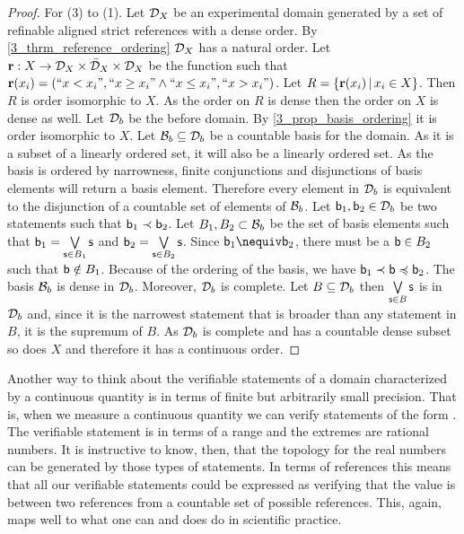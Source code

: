 \documentclass[11pt,letterpaper,fleqn]{memoir} %
\begin{document}
\begin{mathSection}
\begin{proof}
	For (3) to (1). Let $\edomain_X$ be an experimental domain generated by a set of refinable aligned strict references with a dense order. By \ref{3_thrm_reference_ordering} $\edomain_X$ has a natural order. Let $\refStmt : X \to \edomain_X \times \tdomain_X \times \edomain_X$ be the function such that $\refStmt(x_i) = (``x < x_i", ``x \geq x_i" \AND ``x \leq x_i", ``x > x_i")$. Let $R=\{ \refStmt(x_i) \, | \, x_i \in X \}$. Then $R$ is order isomorphic to $X$. As the order on $R$ is dense then the order on $X$ is dense as well. Let $\edomain_b$ be the before domain. By \ref{3_prop_basis_ordering} it is order isomorphic to $X$. Let $\basis_b \subseteq \edomain_b$ be a countable basis for the domain. As it is a subset of a linearly ordered set, it will also be a linearly ordered set. As the basis is ordered by narrowness, finite conjunctions and disjunctions of basis elements will return a basis element. Therefore every element in $\edomain_b$ is equivalent to the disjunction of a countable set of elements of $\basis_b$. Let $\stmt[b]_1, \stmt[b]_2 \in \edomain_b$ be two statements such that $\stmt[b]_1 \snarrower \stmt[b]_2$. Let $B_1, B_2 \subset \basis_b$ be the set of basis elements such that $\stmt[b]_1 = \bigOR\limits_{\stmt \in B_1} \stmt$ and $\stmt[b]_2 = \bigOR\limits_{\stmt \in B_2} \stmt$. Since $\stmt[b]_1 \nequiv \stmt[b]_2$, there must be a $\stmt[b] \in B_2$ such that $\stmt[b] \notin B_1$. Because of the ordering of the basis, we have $\stmt[b]_1 \snarrower \stmt[b] \narrower \stmt[b]_2$. The basis $\basis_b$ is dense in $\edomain_b$. Moreover, $\edomain_b$ is complete. Let $B \subseteq \edomain_b$ then $\bigOR\limits_{\stmt \in B} \stmt$ is in $\edomain_b$ and, since it is the narrowest statement that is broader than any statement in $B$, it is the supremum of $B$. As $\edomain_b$ is complete and has a countable dense subset so does $X$ and therefore it has a continuous order.
\end{proof}
\end{mathSection}

Another way to think about the verifiable statements of a domain characterized by a continuous quantity is in terms of finite but arbitrarily small precision. That is, when we measure a continuous quantity we can verify statements of the form . The verifiable statement is in terms of a range and the extremes are rational numbers. It is instructive to know, then, that the topology for the real numbers can be generated by those types of statements. In terms of references this means that all our verifiable statements could be expressed as verifying that the value is between two references from a countable set of possible references. This, again, maps well to what one can and does do in scientific practice.
\end{document}
